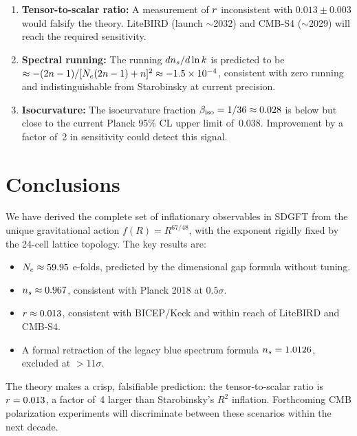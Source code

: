 \documentclass[a4paper,11pt]{article}
\begin{document}
\begin{enumerate}
  \item \textbf{Tensor-to-scalar ratio:}\quad
    A measurement of $r$ inconsistent with $0.013 \pm 0.003$
    would falsify the theory.  LiteBIRD (launch $\sim$2032) and
    CMB-S4 ($\sim$2029) will reach the required sensitivity.

  \item \textbf{Spectral running:}\quad
    The running $dn_s/d\ln k$ is predicted to be
    $\approx -(2n-1)/[N_e(2n-1)+n]^2 \approx
    -1.5 \times 10^{-4}$, consistent with zero running and
    indistinguishable from Starobinsky at current precision.

  \item \textbf{Isocurvature:}\quad
    The isocurvature fraction $\beta_{\mathrm{iso}} = 1/36 \approx 0.028$
    is below but close to the current Planck 95\% CL upper
    limit of~0.038.  Improvement by a factor of~2 in sensitivity
    could detect this signal.
\end{enumerate}

\section{Conclusions}
\label{sec:conclusions}

We have derived the complete set of inflationary observables in
SDGFT from the unique gravitational action $f(R) = R^{67/48}$,
with the exponent rigidly fixed by the 24-cell lattice topology.
The key results are:
\begin{itemize}
  \item $N_e \approx 59.95$ e-folds, predicted by the dimensional
    gap formula without tuning.
  \item $n_s \approx 0.967$, consistent with Planck 2018 at
    $0.5\sigma$.
  \item $r \approx 0.013$, consistent with BICEP/Keck and
    within reach of LiteBIRD and CMB-S4.
  \item A formal retraction of the legacy blue spectrum formula
    $n_s = 1.0126$, excluded at $>11\sigma$.
\end{itemize}

The theory makes a crisp, falsifiable prediction: the
tensor-to-scalar ratio is $r = 0.013$, a factor of~4 larger
than Starobinsky's $R^2$ inflation.  Forthcoming CMB polarization
experiments will discriminate between these scenarios within the
next decade.
\end{document}
